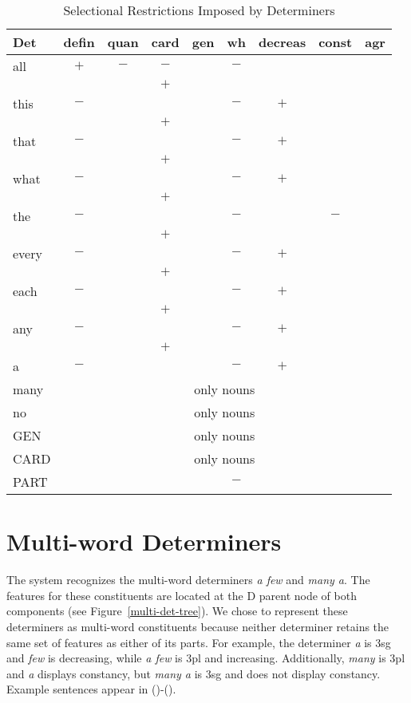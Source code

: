 \begin{table}[hbt]
\vspace*{-2mm}
\centering
\begin{tabular}{|l||c|c|c|c|c|c|c|c|}
\hline
Det&defin&quan&card&gen&wh&decreas&const&agr\\
\hline
\hline
all&$+$&$-$&$-$&&$-$&&&\\
&&&$+$&&&&&\\ \hline
this&$-$&&&&$-$&$+$&&\\
&&&$+$&&&&&\\ \hline
that&$-$&&&&$-$&$+$&&\\
&&&$+$&&&&&\\ \hline
what&$-$&&&&$-$&$+$&&\\
&&&$+$&&&&&\\ \hline
the&$-$&&&&$-$&&$-$&\\ 
&&&$+$&&&&&\\ \hline
every&$-$&&&&$-$&$+$&&\\
&&&$+$&&&&&\\ \hline
each&$-$&&&&$-$&$+$&&\\
&&&$+$&&&&&\\ \hline
any&$-$&&&&$-$&$+$&&\\ 
&&&$+$&&&&&\\ \hline
a&$-$&&&&$-$&$+$&&\\ \hline
many&\multicolumn{8}{c|}{only nouns}\\ \hline
no&\multicolumn{8}{c|}{only nouns}\\ \hline
GEN&\multicolumn{8}{c|}{only nouns}\\ \hline
CARD&\multicolumn{8}{c|}{only nouns}\\ \hline
PART&&&&&$-$&&&\\ \hline
\end{tabular}
\caption{Selectional Restrictions Imposed by Determiners}
\label{det-ordering}
\end{table}


\section{Multi-word Determiners}
The system recognizes the multi-word determiners {\it a few} and {\it many a}.
The features for these constituents are located at the D parent node of both
components (see Figure~\ref{multi-det-tree}).  We chose to represent these 
determiners as multi-word constituents because neither determiner retains the 
same set of features as either of its parts.  For example, the determiner 
{\it a} is 3sg and {\it few} is decreasing, while {\it a few} is 3pl and 
increasing.  Additionally, {\it many} is 3pl and {\it a} displays constancy, 
but {\it many a} is 3sg and does not display constancy.  Example sentences
appear in ()-().

